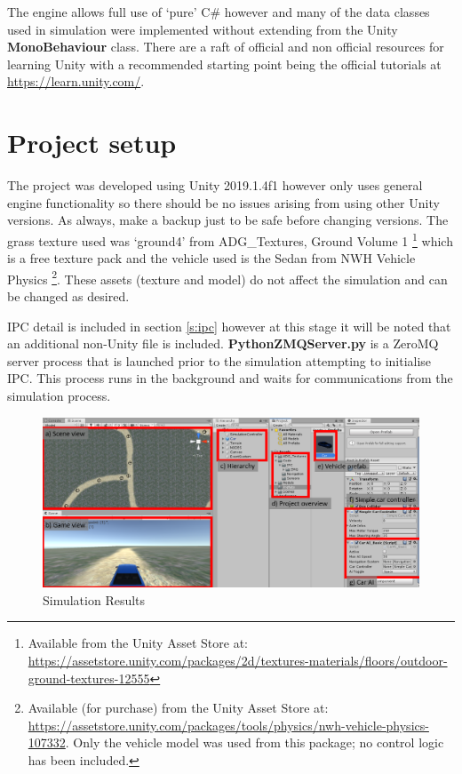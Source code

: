 \documentclass{article}
\begin{document}
The engine allows full use of `pure' C\# however and many of the data classes used in simulation were implemented without extending from the Unity \textbf{MonoBehaviour} class. There are a raft of official and non official resources for learning Unity with a recommended starting point being the official tutorials at \url{https://learn.unity.com/}. 

\section{Project setup}

The project was developed using Unity 2019.1.4f1 however only uses general engine functionality so there should be no issues arising from using other Unity versions. As always, make a backup just to be safe before changing versions. The grass texture used was `ground4' from ADG\_Textures, Ground Volume 1 \footnote{Available from the Unity Asset Store at:  \url{https://assetstore.unity.com/packages/2d/textures-materials/floors/outdoor-ground-textures-12555} } which is a free texture pack and the vehicle used is the Sedan from NWH Vehicle Physics \footnote{Available (for purchase) from the Unity Asset Store at: \url{https://assetstore.unity.com/packages/tools/physics/nwh-vehicle-physics-107332}. Only the vehicle model was used from this package; no control logic has been included. }. These assets (texture and model) do not affect the simulation and can be changed as desired.

IPC detail is included in section \ref{s:ipc} however at this stage it will be noted that an additional non-Unity file is included. \textbf{PythonZMQServer.py} is a ZeroMQ server process that is launched prior to the simulation attempting to initialise IPC. This process runs in the background and waits for communications from the simulation process.

\begin{figure}[h!]
	\centering
	\includegraphics[width=0.95\linewidth]{projectOverviewAnnotated.png}
	\caption{Simulation Results}
	\label{projectOverviewAnnotated}
\end{figure}
\end{document}
